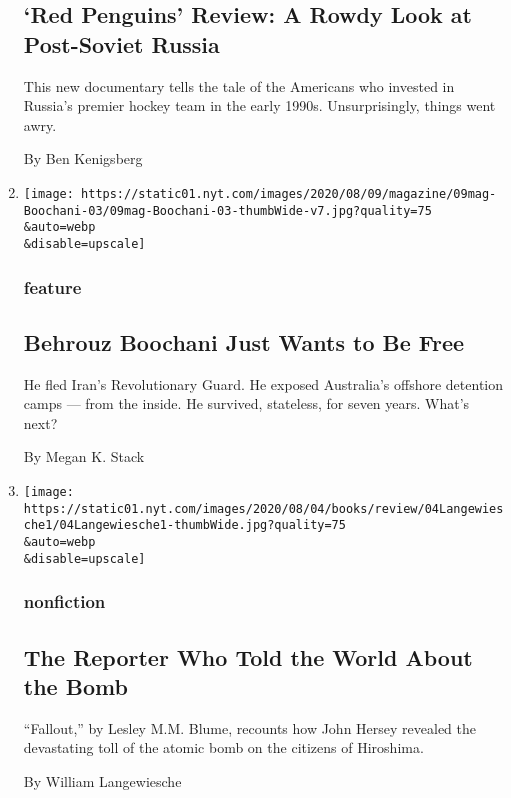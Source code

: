 \begin{enumerate}
  \hypertarget{red-penguins-review-a-rowdy-look-at-post-soviet-russia}{%
  \subsection{`Red Penguins' Review: A Rowdy Look at Post-Soviet
  Russia}\label{red-penguins-review-a-rowdy-look-at-post-soviet-russia}}

  This new documentary tells the tale of the Americans who invested in
  Russia's premier hockey team in the early 1990s. Unsurprisingly,
  things went awry.

  By Ben Kenigsberg
\item
  \href{/2020/08/04/magazine/behrouz-boochani-australia.html}{}

  \texttt{[image: https://static01.nyt.com/images/2020/08/09/magazine/09mag-Boochani-03/09mag-Boochani-03-thumbWide-v7.jpg?quality=75\\\&auto=webp\\\&disable=upscale]}

  \hypertarget{feature}{%
  \subsubsection{feature}\label{feature}}

  \hypertarget{behrouz-boochani-just-wants-to-be-free}{%
  \subsection{Behrouz Boochani Just Wants to Be
  Free}\label{behrouz-boochani-just-wants-to-be-free}}

  He fled Iran's Revolutionary Guard. He exposed Australia's offshore
  detention camps --- from the inside. He survived, stateless, for seven
  years. What's next?

  By Megan K. Stack
\item
  \href{/2020/08/04/books/review/fallout-hiroshima-hersey-lesley-m-m-blume.html}{}

  \texttt{[image: https://static01.nyt.com/images/2020/08/04/books/review/04Langewiesche1/04Langewiesche1-thumbWide.jpg?quality=75\\\&auto=webp\\\&disable=upscale]}

  \hypertarget{nonfiction-1}{%
  \subsubsection{nonfiction}\label{nonfiction-1}}

  \hypertarget{the-reporter-who-told-the-world-about-the-bomb}{%
  \subsection{The Reporter Who Told the World About the
  Bomb}\label{the-reporter-who-told-the-world-about-the-bomb}}

  ``Fallout,'' by Lesley M.M. Blume, recounts how John Hersey revealed
  the devastating toll of the atomic bomb on the citizens of Hiroshima.

  By William Langewiesche
\end{enumerate}

